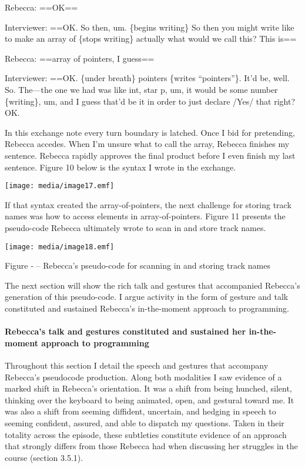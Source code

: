 Rebecca: ==OK==

Interviewer: ==OK. So then, um. \{begins writing\} So then you might
write like to make an array of \{stops writing\} actually what would we
call this? This is==

Rebecca: ==array of pointers, I guess==

Interviewer: ==OK. \{under breath\}
\textbar{}\textbar{}pointers\textbar{}\textbar{} \textbar{}\{writes
``pointers''\}\textbar{}. It'd be, well. So. The---the one we had was
like \textbar{}\textbar{}int, star p, um, it would be some
number\textbar{}\textbar{} \textbar{}\{writing\}\textbar{}, um, and I
guess that'd be it in order to just declare /Yes/ that right? OK.

In this exchange note every turn boundary is latched. Once I bid for
pretending, Rebecca accedes. When I'm unsure what to call the array,
Rebecca finishes my sentence. Rebecca rapidly approves the final product
before I even finish my last sentence. Figure 10 below is the syntax I
wrote in the exchange.

\texttt{[image: media/image17.emf]}

If that syntax created the array-of-pointers, the next challenge for
storing track names was how to access elements in array-of-pointers.
Figure 11 presents the pseudo-code Rebecca ultimately wrote to scan in
and store track names.

\texttt{[image: media/image18.emf]}

\protect\hypertarget{ux5fToc252445974}{}{}Figure ‑ -- Rebecca's
pseudo-code for scanning in and storing track names

The next section will show the rich talk and gestures that accompanied
Rebecca's generation of this pseudo-code. I argue activity in the form
of gesture and talk constituted and sustained Rebecca's in-the-moment
approach to programming.

\paragraph{Rebecca's talk and gestures constituted and sustained her
in-the-moment approach to
programming}\label{rebeccas-talk-and-gestures-constituted-and-sustained-her-in-the-moment-approach-to-programming}

Throughout this section I detail the speech and gestures that accompany
Rebecca's pseudocode production. Along both modalities I saw evidence of
a marked shift in Rebecca's orientation. It was a shift from being
hunched, silent, thinking over the keyboard to being animated, open, and
gestural toward me. It was also a shift from seeming diffident,
uncertain, and hedging in speech to seeming confident, assured, and able
to dispatch my questions. Taken in their totality across the episode,
these subtleties constitute evidence of an approach that strongly
differs from those Rebecca had when discussing her struggles in the
course (section 3.5.1).

